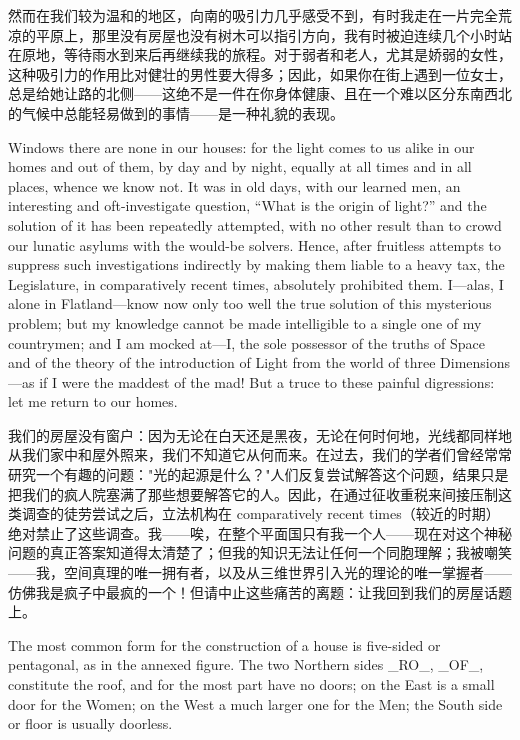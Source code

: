 \documentclass[12pt,UTF8]{ctexbook}
\begin{document}
然而在我们较为温和的地区，向南的吸引力几乎感受不到，有时我走在一片完全荒凉的平原上，那里没有房屋也没有树木可以指引方向，我有时被迫连续几个小时站在原地，等待雨水到来后再继续我的旅程。对于弱者和老人，尤其是娇弱的女性，这种吸引力的作用比对健壮的男性要大得多；因此，如果你在街上遇到一位女士，总是给她让路的北侧——这绝不是一件在你身体健康、且在一个难以区分东南西北的气候中总能轻易做到的事情——是一种礼貌的表现。

Windows there are none in our houses: for the light comes to us alike in our homes and out of them, by day and by night, equally at all times and in all places, whence we know not. It was in old days, with our learned men, an interesting and oft-investigate question, ``What is the origin of light?'' and the solution of it has been repeatedly attempted, with no other result than to crowd our lunatic asylums with the would-be solvers. Hence, after fruitless attempts to suppress such investigations indirectly by making them liable to a heavy tax, the Legislature, in comparatively recent times, absolutely prohibited them. I---alas, I alone in Flatland---know now only too well the true solution of this mysterious problem; but my knowledge cannot be made intelligible to a single one of my countrymen; and I am mocked at---I, the sole possessor of the truths of Space and of the theory of the introduction of Light from the world of three Dimensions---as if I were the maddest of the mad! But a truce to these painful digressions: let me return to our homes.

我们的房屋没有窗户：因为无论在白天还是黑夜，无论在何时何地，光线都同样地从我们家中和屋外照来，我们不知道它从何而来。在过去，我们的学者们曾经常常研究一个有趣的问题："光的起源是什么？"人们反复尝试解答这个问题，结果只是把我们的疯人院塞满了那些想要解答它的人。因此，在通过征收重税来间接压制这类调查的徒劳尝试之后，立法机构在 comparatively recent times（较近的时期）绝对禁止了这些调查。我——唉，在整个平面国只有我一个人——现在对这个神秘问题的真正答案知道得太清楚了；但我的知识无法让任何一个同胞理解；我被嘲笑——我，空间真理的唯一拥有者，以及从三维世界引入光的理论的唯一掌握者——仿佛我是疯子中最疯的一个！但请中止这些痛苦的离题：让我回到我们的房屋话题上。

The most common form for the construction of a house is five-sided or pentagonal, as in the annexed figure. The two Northern sides \_RO\_, \_OF\_, constitute the roof, and for the most part have no doors; on the East is a small door for the Women; on the West a much larger one for the Men; the South side or floor is usually doorless.
\end{document}
